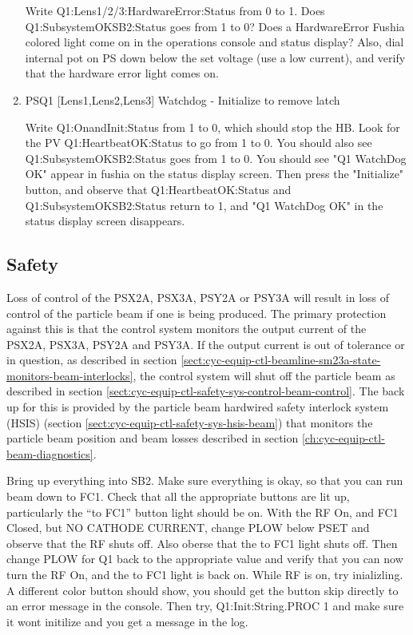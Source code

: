 \documentclass[11pt]{book}		%
\begin{document}
\begin{enumerate}
\color{red}
Write Q1:Lens1/2/3:HardwareError:Status from 0 to 1. Does Q1:SubsystemOKSB2:Status goes from 1 to 0? Does a HardwareError Fushia colored light come on in the operations console and status display? Also, dial internal pot on PS down below the set voltage (use a low current), and verify that the hardware error light comes on.
\color{black}

 \item PSQ1 [Lens1,Lens2,Lens3] Watchdog - Initialize to remove latch

\color{red}
Write Q1:OnandInit:Status from 1 to 0, which should stop the HB. Look for the PV Q1:HeartbeatOK:Status to go from 1 to 0. You should also see Q1:SubsystemOKSB2:Status goes from 1 to 0. You should see "Q1 WatchDog OK" appear in fushia on the status display screen. Then press the "Initialize" button, and observe that Q1:HeartbeatOK:Status and Q1:SubsystemOKSB2:Status return to 1, and "Q1 WatchDog OK" in the status display screen disappears.
\color{black}

\end{enumerate}


\subsection{Safety}\label{sect:cyc-equip-ctl-beamline-sm23a-safety}

Loss of control of the PSX2A, PSX3A, PSY2A or PSY3A will result in loss of control of the particle beam if one is being produced.  The primary protection against this is that the control system monitors the output current of the PSX2A, PSX3A, PSY2A and PSY3A.  If the output current is out of tolerance or in question, as described in section \ref{sect:cyc-equip-ctl-beamline-sm23a-state-monitors-beam-interlocks}, the control system will shut off the particle beam as described in section \ref{sect:cyc-equip-ctl-safety-sys-control-beam-control}.  The back up for this is provided by the particle beam hardwired safety interlock system (HSIS) (section \ref{sect:cyc-equip-ctl-safety-sys-hsis-beam}) that monitors the particle beam position and beam losses described in section \ref{ch:cyc-equip-ctl-beam-diagnostics}.


\color{red}

Bring up everything into SB2. Make sure everything is okay, so that you can run beam down to FC1. Check that all the appropriate buttons are lit up, particularly the ``to FC1'' button light should be on. With the RF On, and FC1 Closed, but NO CATHODE CURRENT, change PLOW below PSET and observe that the RF shuts off. Also oberse that the to FC1 light shuts off. Then change PLOW for Q1 back to the appropriate value and verify that you can now turn the RF On, and the to FC1 light is back on. While RF is on, try inializling. A different color button should show, you should get the button skip directly to an error message in the console. Then try, Q1:Init:String.PROC 1 and make sure it wont initilize and you get a message in the log.
\end{document}
